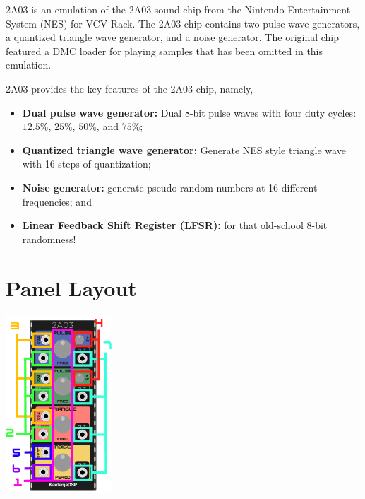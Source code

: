 \documentclass[12pt,a4paper]{article}
\begin{document}
2A03 is an emulation of the 2A03 sound chip from the Nintendo Entertainment System (NES) for VCV Rack. The 2A03 chip contains two pulse wave generators, a quantized triangle wave generator, and a noise generator. The original chip featured a DMC loader for playing samples that has been omitted in this emulation.

2A03 provides the key features of the 2A03 chip, namely,
\begin{itemize}
  \item \textbf{Dual pulse wave generator:} Dual 8-bit pulse waves with four duty cycles: $12.5\%$, $25\%$, $50\%$, and $75\%$;
  \item \textbf{Quantized triangle wave generator:} Generate NES style triangle wave with 16 steps of quantization;
  \item \textbf{Noise generator:} generate pseudo-random numbers at 16 different frequencies; and
  \item \textbf{Linear Feedback Shift Register (LFSR):} for that old-school 8-bit randomness!
\end{itemize}


\section{Panel Layout}

\begin{center}
\includegraphics[width=0.3\textwidth]{2A03-Manual}
\end{center}
\end{document}
